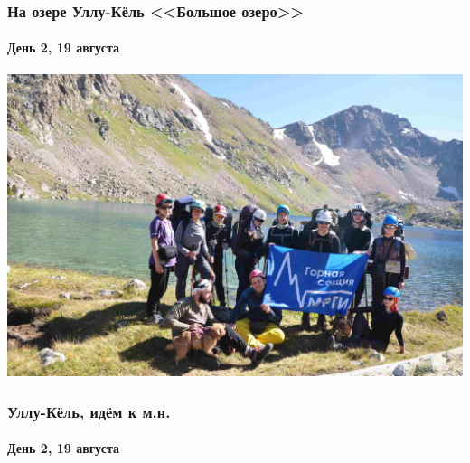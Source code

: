 \begin{frame}
	\frametitle{На озере Уллу-Кёль <<Большое озеро>>}
	\framesubtitle{День 2, 19 августа}
	\centering
	\includegraphics[width=\linewidth]{../pics/DSC_0800}
\end{frame}

\begin{frame}
	\frametitle{Уллу-Кёль, идём к м.н.}
	\framesubtitle{День 2, 19 августа}
	\centering
\end{frame}


